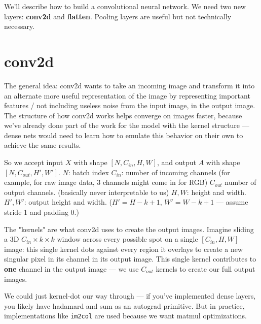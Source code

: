 \documentclass[12pt]{article}
\begin{document}
\pagebreak
\begin{outline}

We'll describe how to build a convolutional neural network. We need two new layers: \textbf{conv2d} and \textbf{flatten}. Pooling layers are useful but not technically necessary.

\section{conv2d}

The general idea: conv2d wants to take an incoming image and transform it into an alternate more useful representation of the image by representing important features / not including useless noise from the input image, in the output image.
\1 The structure of how conv2d works helps converge on images faster, because we've already done part of the work for the model with the kernel structure --- dense nets would need to learn how to emulate this behavior on their own to achieve the same results.
\\\0

So we accept input $X$ with shape $[N,C_{in},H,W]$, and output $A$ with shape $[N,C_{out},H',W']$.
\1 $N$: batch index
\1 $C_{in}$: number of incoming channels (for example, for raw image data, 3 channels might come in for RGB)
\1 $C_{out}$ number of output channels. (basically never interpretable to us)
\1 $H,W$: height and width.
\1 $H',W'$: output height and width. ($H'=H-k+1$, $W'=W-k+1$ --- assume stride 1 and padding 0.)
\\\0

The "kernels" are what conv2d uses to create the output images. Imagine sliding a 3D $C_{in} \times k \times k$ window across every possible spot on a single $[C_{in},H,W]$ image: this single kernel dots against every region it overlays to create a new singular pixel in its channel in its output image.
\1 This single kernel contributes to \textbf{one} channel in the output image --- we use $C_{out}$ kernels to create our full output images.
\\\0

We could just kernel-dot our way through --- if you've implemented dense layers, you likely have hadamard and sum as an autograd primitive. But in practice, implementations like \texttt{im2col} are used because we want matmul optimizations. \\


\end{outline}
\end{document}
